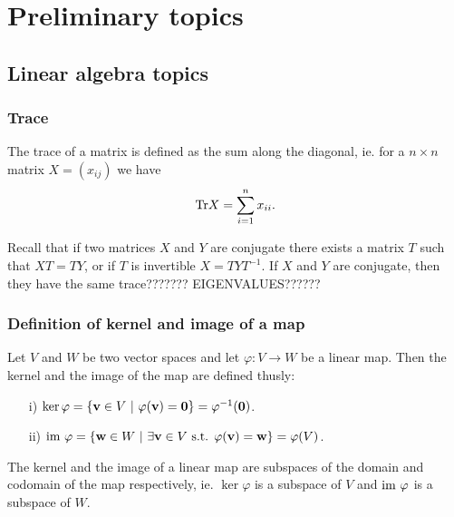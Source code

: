 \clearpage{\thispagestyle{empty}}
\section{Preliminary topics}

\subsection{Linear algebra topics}

	\subsubsection{Trace}
		
		The trace of a matrix is defined as the sum along the diagonal, ie. for a $n \times n$ matrix $X = (x_{ij})$ we have
		\begin{align*}
			\text{Tr} X = \sum_{i=1}^{n} x_{ii}.
		\end{align*}
		
		Recall that if two matrices $X$ and $Y$ are conjugate there exists a matrix $T$ such that $XT = TY$, or if $T$ is invertible $X = TYT^{-1}$. If $X$ and $Y$ are conjugate, then they have the same trace??????? EIGENVALUES??????

	\subsubsection{Definition of kernel and image of a map}
	
	\begin{definition}\label{def:kernelimage}
		Let $V$ and $W$ be two vector spaces and let $\varphi: V \rightarrow W$ be a linear map. Then the kernel and the image of the map are defined thusly:
		\begin{itemize}
			\item[i)] $\ker \varphi = \left\lbrace \mathbf{v} \in V \ \middle\vert \ \varphi(\mathbf{v}) = \mathbf{0} \right\rbrace = \varphi^{-1}(\mathbf{0})$.
			\item[ii)] $\text{im } \varphi = \left\lbrace \mathbf{w} \in W \ \middle\vert \ \exists \mathbf{v} \in V \text{ s.t. } \varphi(\mathbf{v}) = \mathbf{w} \right\rbrace = \varphi(V)$.
		\end{itemize}
	\end{definition}
	
	\begin{remark}
		The kernel and the image of a linear map are subspaces of the domain and codomain of the map respectively, ie. $\ker \varphi$ is a subspace of $V$ and $\text{im } \varphi$ is a subspace of $W$.
	\end{remark}
	
